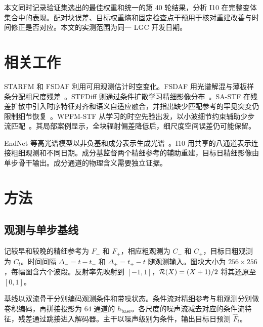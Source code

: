 \documentclass[a4paper,10pt,twocolumn]{article}
\begin{document}
本文同时记录验证集选出的最佳权重和统一的第 40 轮结果，分析 I10 在完整变体集合中的表现。配对块误差、目标权重熵和固定检查点干预用于核对重建改善与时间修正是否对应。本文的实测范围为同一 LGC 开发日期。

\section{相关工作}
STARFM 和 FSDAF 利用可用观测估计时空变化。FSDAF 用光谱解混与薄板样条分配粗尺度残差~\citep{gao2006starfm,zhu2016fsdaf}。STFDiff 则通过条件扩散学习精细影像分布~\citep{huang2024stfdiff}。SA-STF 在残差扩散中引入时序特征对齐和语义自适应融合，并指出缺少匹配参考的罕见突变仍限制细节恢复~\citep{zhang2026sastf}。WPFM-STF 从学习的时空先验出发，以小波细节约束辅助少步流匹配~\citep{hu2026wpfm}。其局部案例显示，全块辐射偏差降低后，细尺度空间误差仍可能保留。

EndNet 等高光谱模型以非负基和成分表示生成光谱~\citep{ozkan2019endnet}。I10 用共享的八通道表示连接粗细观测和不同日期。成分基监督两个精细参考的辅助重建，目标日精细影像由单步骨干输出。成分通道的物理含义需要独立证据。

\section{方法}
\subsection{观测与单步基线}
记较早和较晚的精细参考为 $F_-$ 和 $F_+$，相应粗观测为 $C_-$ 和 $C_+$，目标日粗观测为 $C_t$。时间间隔 $\Delta_-=t-t_-$ 和 $\Delta_+=t_+-t$ 随观测输入。图块大小为 $256\times256$，每幅图含六个波段。反射率先映射到 $[-1,1]$，$\mathcal R(X)=(X+1)/2$ 将其还原至 $[0,1]$。

基线以双流骨干分别编码观测条件和带噪状态。条件流对精细参考与粗观测分别做卷积编码，再拼接投影为 $64$ 通道的 $h_{\mathrm{base}}$。各尺度的噪声流减去对应的条件流特征，残差通过跳接进入解码器。主干以噪声级别为条件，输出目标日预测 $\widehat F_t$。
\end{document}
